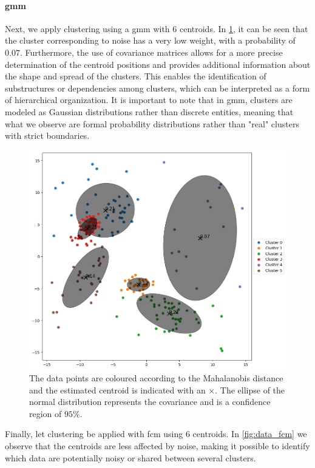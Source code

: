 \begin{modified}
\paragraph{\gls{gmm}} Next, we apply clustering using a \gls{gmm} with $6$ centroids. In \cref{fig:data_gmm}, it can be seen that the cluster corresponding to noise has a very low weight, with a probability of $0.07$. Furthermore, the use of covariance matrices allows for a more precise determination of the centroid positions and provides additional information about the shape and spread of the clusters. This enables the identification of substructures or dependencies among clusters, which can be interpreted as a form of hierarchical organization. It is important to note that in \gls{gmm}, clusters are modeled as Gaussian distributions rather than discrete entities, meaning that what we observe are formal probability distributions rather than "real" clusters with strict boundaries.
\end{modified}

\begin{figure}[H]
	\centering
	\includegraphics[width=0.9\linewidth]{Figures/dati_gmm.png}
	\caption[Example of GMM clustering]{The data points are coloured according to the Mahalanobis distance and the estimated centroid is indicated with an $\times$. The ellipse of the normal distribution represents the covariance and is a confidence region of $95\%$.}
	\label{fig:data_gmm}
\end{figure}

\noindent Finally, let clustering be applied with \gls{fcm} using $6$ centroids. In \cref{fig:data_fcm} we observe that the centroids are less affected by noise, making it possible to identify which data are potentially noisy or shared between several clusters.

